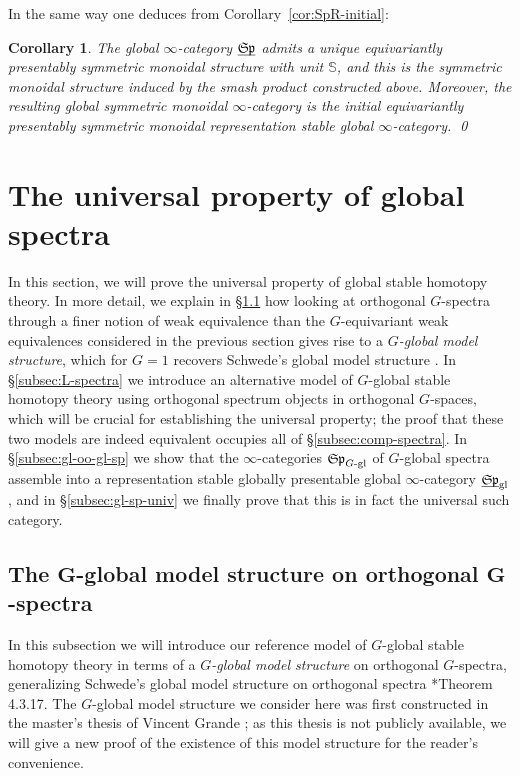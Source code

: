\documentclass[reqno]{memo-l}
\theoremstyle{mythm}
\newtheorem{cor}[thm]{Corollary}
\theoremstyle{definition}
\numberwithin{equation}{section}
\newcommand{\gl}{\textup{gl}}
\newcommand{\ulhelper}[2]{\underline{\setbox0=\hbox{$#1#2$}\dp0=0.4pt \box0\relax}}
\newcommand{\ul}[1]{{\mathpalette\ulhelper{#1}}\hbox{\rule[-2pt]{0pt}{0pt}}}
\newcommand{\mySp}{{\mathfrak S\kern-.5pt\mathfrak p}}
\begin{document}
In the same way one deduces from Corollary~\ref{cor:SpR-initial}:

\begin{cor}\label{cor:equiv-spectra-smash}
    The global $\infty$-category $\ul\mySp$ admits a unique equivariantly presentably symmetric monoidal structure with unit $\mathbb S$, and this is the symmetric monoidal structure induced by the smash product constructed above. Moreover, the resulting global symmetric monoidal $\infty$-category is the initial equivariantly presentably symmetric monoidal representation stable global $\infty$-category. \qed
\end{cor}

\section{The universal property of global spectra}\label{sec:global-spectra}
In this section, we will prove the universal property of global stable homotopy theory. In more detail, we explain in §\ref{subsec:gl-spectra} how looking at orthogonal $G$-spectra through a finer notion of weak equivalence than the $G$-equivariant weak equivalences considered in the previous section gives rise to a \emph{$G$-global model structure}, which for $G=1$ recovers Schwede's global model structure \cite{schwede2018global}. In §\ref{subsec:L-spectra} we introduce an alternative model of $G$-global stable homotopy theory using orthogonal spectrum objects in orthogonal $G$-spaces, which will be crucial for establishing the universal property; the proof that these two models are indeed equivalent occupies all of §\ref{subsec:comp-spectra}.
In §\ref{subsec:gl-oo-gl-sp} we show that the $\infty$-categories $\mySp_\textup{$G$-gl}$ of $G$-global spectra assemble into a representation stable globally presentable global $\infty$-category $\ul\mySp_\gl$, and in §\ref{subsec:gl-sp-univ} we finally prove that this is in fact the universal such category.

\subsection{The \texorpdfstring{$\bm G$}{G}-global model structure on orthogonal \texorpdfstring{$\bm G$}{G}-spectra}\label{subsec:gl-spectra}
In this subsection we will introduce our reference model of $G$-global stable homotopy theory in terms of a \emph{$G$-global model structure} on orthogonal $G$-spectra, generalizing Schwede's global model structure on orthogonal spectra \cite{schwede2018global}*{Theorem 4.3.17}. The $G$-global model structure we consider here was first constructed in the master's thesis of Vincent Grande \cite{grande-thesis}; as this thesis is not publicly available, we will give a new proof of the existence of this model structure for the reader's convenience.
\end{document}
